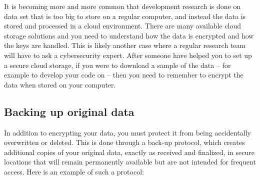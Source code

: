 It is becoming more and more common that development research
is done on data set that is too big to store on a regular computer,
and instead the data is stored and processed in a cloud environment.
There are many available cloud storage solutions
and you need to understand how the data is encrypted and how the keys are handled.
This is likely another case where a regular research team will have to ask a cybersecurity expert.
After someone have helped you to set up a secure cloud storage,
if you were to download a sample of the data --
for example to develop your code on --
then you need to remember to encrypt the data when stored on your computer.

\subsection{Backing up original data}
In addition to encrypting your data, you must protect it
from being accidentally overwritten or deleted.
This is done through a back-up protocol,
which creates additional copies of your original data,
exactly as received and finalized,
in secure locations that will remain permanently available
but are not intended for frequent access.
Here is an example of such a protocol:

